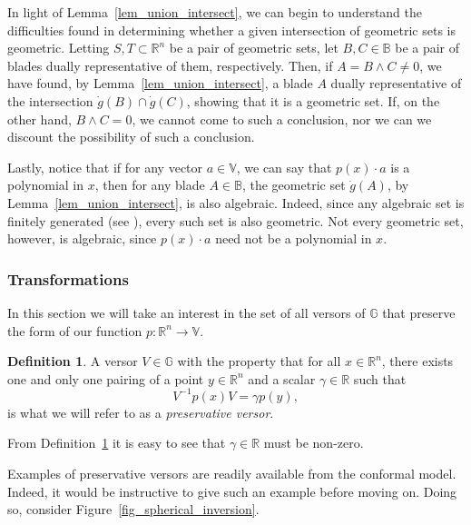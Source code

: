 \documentclass{birkjour}
\theoremstyle{definition}
\newtheorem{defn}[thm]{Definition}
\theoremstyle{remark}
\numberwithin{equation}{section}
\newcommand{\R}{\mathbb{R}}
\newcommand{\B}{\mathbb{B}}
\newcommand{\G}{\mathbb{G}}
\newcommand{\V}{\mathbb{V}}
\newcommand{\gd}{\dot{g}}
\begin{document}
In light of Lemma~\ref{lem_union_intersect}, we can begin to understand the difficulties found in determining
whether a given intersection of geometric sets is geometric.  Letting $S,T\subset\R^n$ be
a pair of geometric sets, let $B,C\in\B$ be a pair of blades dually representative of them, respectively.
Then, if $A=B\wedge C\neq 0$, we have found, by Lemma~\ref{lem_union_intersect}, a blade $A$ dually
representative of the intersection $\gd(B)\cap\gd(C)$, showing that it is a geometric set.
If, on the other hand, $B\wedge C=0$, we cannot come to such a conclusion, nor we can we
discount the possibility of such a conclusion.

Lastly, notice that if for any vector $a\in\V$, we can say that $p(x)\cdot a$ is a polynomial in $x$,
then for any blade $A\in\B$, the geometric set $\gd(A)$, by Lemma~\ref{lem_union_intersect},
is also algebraic.  Indeed, since any algebraic set is finitely generated (see \cite[p.~204]{Garrity13}), every such set is also geometric.
Not every geometric set, however, is algebraic, since $p(x)\cdot a$ need not be a polynomial in $x$.

\subsubsection{Transformations}

In this section we will take an interest in the set of all versors of $\G$ that preserve the form
of our function $p:\R^n\to\V$.
\begin{defn}\label{def_preservative_versor}
A versor $V\in\G$ with the property that for all $x\in\R^n$, there exists one and only one
pairing of a point $y\in\R^n$ and a scalar $\gamma\in\R$ such that
\begin{equation}\label{equ_vpv_p}
V^{-1}p(x)V = \gamma p(y),
\end{equation}
is what we will refer to as a {\it preservative versor}.
\end{defn}

From Definition~\ref{def_preservative_versor} it is easy to see that $\gamma\in\R$ must be non-zero.

Examples of preservative versors are readily available from the conformal model.  Indeed,
it would be instructive to give such an example before moving on.  Doing so, consider
Figure~\ref{fig_spherical_inversion}.
\end{document}
